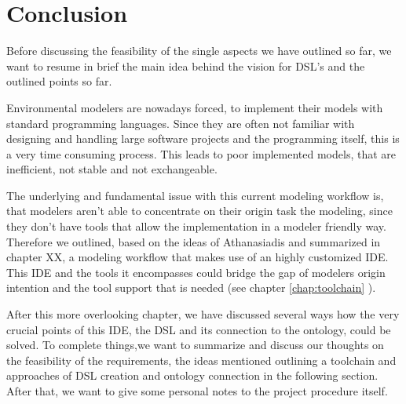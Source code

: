 \chapter{Conclusion}
\par
Before discussing the feasibility of the single aspects we have outlined so far, we want to resume in brief the main idea behind the vision for DSL’s and the outlined points so far.
\par
Environmental modelers are nowadays forced, to implement their models with standard programming languages. Since they are often not familiar with designing and handling large software projects and the programming itself, this is a very time consuming process. This leads to poor implemented models, that are inefficient, not stable and not exchangeable.
\par
The underlying and fundamental issue with this current modeling workflow is, that modelers aren’t able to concentrate on their origin task the modeling, since they don't have tools that allow the implementation in a modeler friendly way. Therefore we outlined, based on the ideas of Athanasiadis and summarized in 
 chapter XX, a modeling workflow that makes use of an highly customized IDE. This IDE and the tools it encompasses could bridge the gap of modelers origin intention and the tool support that is needed (see chapter \ref{chap:toolchain} ).
\par
After this more overlooking chapter, we have discussed several ways how the very crucial points of this IDE, the DSL and its connection to the ontology, could be solved. To complete things,we want to summarize and discuss our thoughts on the feasibility of the requirements, the ideas mentioned outlining a toolchain and approaches of DSL creation and ontology connection in the following section. After that, we want to give some personal notes to the project procedure itself. 
